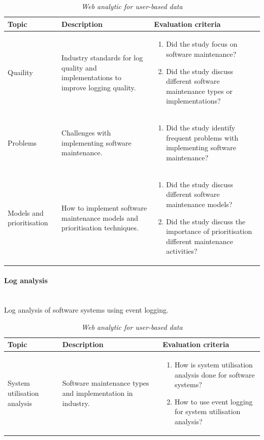 \begin{table}[!htb]
	\centering
	\caption[Software maintenance state of the art topics]
	{\textit{Web analytic for user-based data}}
	\label{tbl:ch1_soaEventLogging}
	\begin{tabularx}{\linewidth}{|l|X|X|}
		\hline \textbf{Topic}  & \textbf{Description} & \textbf{Evaluation criteria}\\
		\hline Quaility & \RaggedRight Industry standards for log quality and implementations to improve logging quality.& \RaggedRight \begin{enumerate}
			\item Did the study focus on software maintenance?
			\item Did the study discuss different software maintenance types or implementations?
		\end{enumerate} \\
		\hline Problems & Challenges with implementing software maintenance. & \RaggedRight \begin{enumerate}
			\item Did the study identify frequent problems with implementing software maintenance?
		\end{enumerate}\\
		\hline Models and prioritisation & How to implement software maintenance models and prioritisation techniques. & \RaggedRight \begin{enumerate}
			\item Did the study discuss different software maintenance models?
			\item Did the study discuss the importance of prioritisation different maintenance activities?
		\end{enumerate} \\
		\hline
	\end{tabularx}
\end{table}

\paragraph{Log analysis} \leavevmode\\
Log analysis of software systems using event logging.

\begin{table}[!htb]
	\centering
	\caption[Software maintenance state of the art topics]
	{\textit{Web analytic for user-based data}}
	\label{tbl:ch1_soaLogAnalysis}
	\begin{tabularx}{\linewidth}{|l|X|X|}
		\hline \textbf{Topic}  & \textbf{Description} & \textbf{Evaluation criteria}\\
		\hline System utilisation analysis & \RaggedRight Software maintenance types and implementation in industry. & \RaggedRight \begin{enumerate}
			\item How is system utilisation analysis done for software systems?
			\item How to use event logging for system utilisation analysis?
		\end{enumerate} \\
		\hline
	\end{tabularx}
\end{table}

